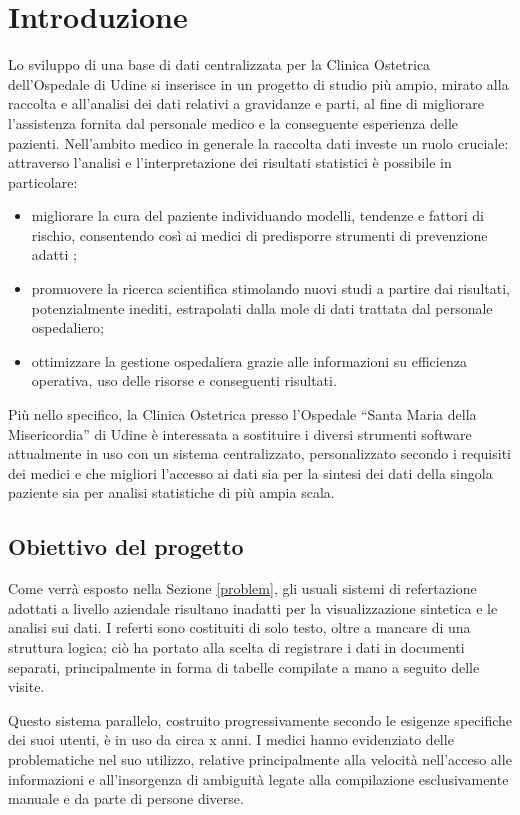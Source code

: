 \chapter{Introduzione}

Lo sviluppo di una base di dati centralizzata per la Clinica Ostetrica dell'Ospedale di Udine si inserisce in un progetto di studio più ampio, mirato alla raccolta e all'analisi dei dati relativi a gravidanze e parti, al fine di migliorare l'assistenza fornita dal personale medico e la conseguente esperienza delle pazienti.
Nell'ambito medico in generale la raccolta dati investe un ruolo cruciale: attraverso l'analisi e l'interpretazione dei risultati statistici è possibile in particolare:
\begin{itemize}
\item migliorare la cura del paziente individuando modelli, tendenze e fattori di rischio, consentendo così ai medici di predisporre strumenti di prevenzione adatti \cite{Cor20,McC16};
\item promuovere la ricerca scientifica stimolando nuovi studi a partire dai risultati, potenzialmente inediti, estrapolati dalla mole di dati trattata dal personale ospedaliero;
\item ottimizzare la gestione ospedaliera grazie alle informazioni su efficienza operativa, uso delle risorse e conseguenti risultati.
\end{itemize}
Più nello specifico, la Clinica Ostetrica presso l'Ospedale \enquote{Santa Maria della Misericordia} di Udine è interessata a sostituire i diversi strumenti software attualmente in uso con un sistema centralizzato, personalizzato secondo i requisiti dei medici e che migliori l'accesso ai dati sia per la sintesi dei dati della singola paziente sia per analisi statistiche di più ampia scala.

\section{Obiettivo del progetto}

Come verrà esposto nella Sezione \ref{problem}, gli usuali sistemi di refertazione adottati a livello aziendale risultano inadatti per la visualizzazione sintetica e le analisi sui dati.
I referti sono costituiti di solo testo, oltre a mancare di una struttura logica; ciò ha portato alla scelta di registrare i dati in documenti separati, principalmente in forma di tabelle compilate a mano a seguito delle visite.

Questo sistema parallelo, costruito progressivamente secondo le esigenze specifiche dei suoi utenti, è in uso da circa x anni.
I medici hanno evidenziato delle problematiche nel suo utilizzo, relative principalmente alla velocità nell'acceso alle informazioni e all'insorgenza di ambiguità legate alla compilazione esclusivamente manuale e da parte di persone diverse.


